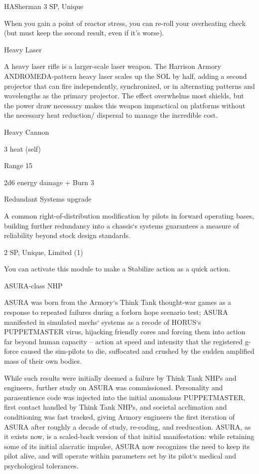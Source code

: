 \begin{mech}{HA}{Sherman}
3 SP, Unique

When you gain a point of reactor stress, you can re-roll your overheating check (but must keep the second result, even if it’s worse).


Heavy Laser

A heavy laser rifle is a larger-scale laser weapon. The Harrison Armory ANDROMEDA-pattern heavy laser scales up the SOL by half, adding a second projector that can fire independently, synchronized, or in alternating patterns and wavelengths as the primary projector. The effect overwhelms most shields, but the power draw necessary makes this weapon impractical on platforms without the necessary heat reduction/ dispersal to manage the incredible cost.

Heavy Cannon

3 heat (self)

Range 15

2d6 energy damage + Burn 3


Redundant Systems upgrade

A common right-of-distribution modification by pilots in forward operating bases, building further redundancy into a chassis‘s systems guarantees a measure of reliability beyond stock design standards.

2 SP, Unique, Limited (1)

You can activate this module to make a Stabilize action as a quick action.


ASURA-class NHP

ASURA was born from the Armory‘s Think Tank thought-war games as a response to repeated failures during a forlorn hope scenario test; ASURA manifested in simulated mechs‘ systems as a recode of HORUS‘s PUPPETMASTER virus, hijacking friendly cores and forcing them into action far beyond human capacity -- action at speed and intensity that the registered g-force caused the sim-pilots to die, suffocated and crushed by the sudden amplified mass of their own bodies.

While such results were initially deemed a failure by Think Tank NHPs and engineers, further study on ASURA was commissioned. Personality and parasentience code was injected into the initial anomalous PUPPETMASTER, first contact handled by Think Tank NHPs, and societal acclimation and conditioning was fast tracked, giving Armory engineers the first iteration of ASURA after roughly a decade of study, re-coding, and reeducation. ASURA, as it exists now, is a scaled-back version of that initial manifestation: while retaining some of its initial alacratic impulse, ASURA now recognizes the need to keep its pilot alive, and will operate within parameters set by its pilot‘s medical and psychological tolerances.


\end{mech}
